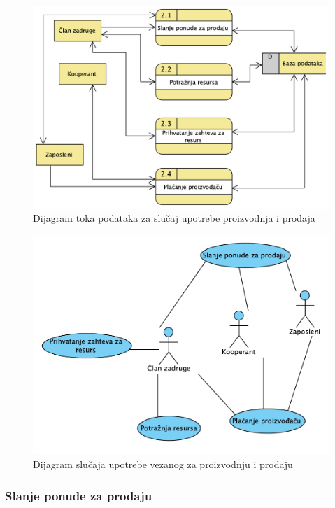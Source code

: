 \documentclass[a4paper]{article}
\begin{document}
\begin{figure}[h!]
    \centering
    \includegraphics[scale=0.64]{images/dtp_proizvodnja_prodaja.png}
    \caption{Dijagram toka podataka za slučaj upotrebe proizvodnja i prodaja}
    \label{dtp_proizvodnja_prodaja}
\end{figure}

\begin{figure}[h!]
    \centering
    \includegraphics[scale=0.64]{images/dslucup_proizvodnja_prodaja.png}
    \caption{Dijagram slučaja upotrebe vezanog za proizvodnju i prodaju}
    \label{dslucup_proizvodnja_prodaja}
\end{figure}

\clearpage

\subsubsection{Slanje ponude za prodaju}
\end{document}
